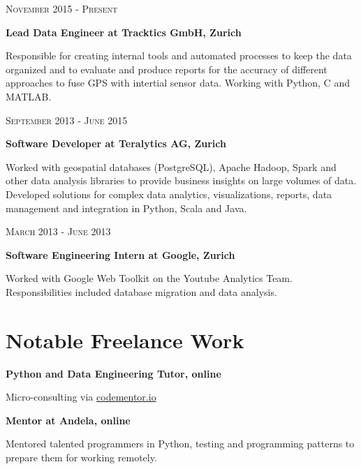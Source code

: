 \documentclass[10pt]{article} %
\begin{document}
\begin{minipage}[t]{0.5\textwidth}
{\raggedleft\textsc{November 2015 - Present}\par}

{\raggedright\large \textbf{Lead Data Engineer at Tracktics GmbH, Zurich}\\
}

\normalsize{ Responsible for creating internal tools and automated processes to keep the data organized and to evaluate and produce reports for the accuracy of different approaches to fuse GPS with intertial sensor data. Working with Python, C and MATLAB.}

{\raggedleft\textsc{September 2013 - June 2015}\par}

{\raggedright\large \textbf{Software Developer at Teralytics AG, Zurich}\\
}

\normalsize{Worked with geospatial databases (PostgreSQL), Apache Hadoop, Spark and other data analysis libraries to provide business insights on large volumes of data. Developed solutions for complex data analytics, visualizations, reports, data management and integration in Python, Scala and Java.}
{\raggedleft\textsc{March 2013 - June 2013}\par}

{\raggedright\large \textbf{Software Engineering Intern at Google, Zurich}\\
}

\normalsize{Worked with Google Web Toolkit on the Youtube Analytics Team. Responsibilities included database migration and data analysis.}\\

\section{Notable Freelance Work} 


{\raggedright\large \textbf{Python and Data Engineering Tutor, online}\\
}

\normalsize{Micro-consulting via \href{http://www.codementor.io/carolinux}{codementor.io}} 

{\raggedright\large \textbf{Mentor at Andela, online}\\
}

\normalsize{Mentored talented programmers in Python, testing and programming patterns to prepare them for working remotely.} 


\end{minipage}
\end{document}
